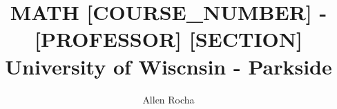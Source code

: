 \documentclass{article}
\begin{document}
\title{MATH [COURSE_NUMBER] - [PROFESSOR] [SECTION]\\
        University of Wiscnsin - Parkside}
\author{Allen Rocha}
\maketitle
\newpage
\end{document}
